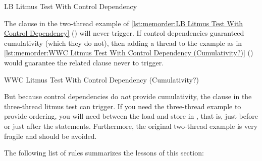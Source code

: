 \begin{listing}

\caption{LB Litmus Test With Control Dependency}
\label{lst:memorder:LB Litmus Test With Control Dependency}
\end{listing}

The  clause in the two-thread example of
\cref{lst:memorder:LB Litmus Test With Control Dependency}
()
will never trigger.
If control dependencies guaranteed cumulativity (which they do
not), then adding a thread to the example as in
\cref{lst:memorder:WWC Litmus Test With Control Dependency (Cumulativity?)}
()
would guarantee the related  clause never to trigger.

\begin{listing}

\caption{WWC Litmus Test With Control Dependency (Cumulativity?)}
\label{lst:memorder:WWC Litmus Test With Control Dependency (Cumulativity?)}
\end{listing}

But because control dependencies do \emph{not} provide cumulativity, the
 clause in the three-thread litmus test can trigger.
If you need the three-thread example to provide ordering, you will need
 between the load and store in ,
that is, just before or just after the  statements.
Furthermore, the original two-thread example is very fragile and should be avoided.

\QuickQuizEnd

The following list of rules summarizes the lessons of this section:

